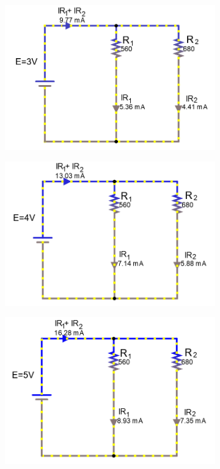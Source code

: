 \documentclass[a4paper]{article}
\begin{document}
\begin{figure}[H]
\begin{subfigure}{0.48\textwidth}
\includegraphics[width=1.16\linewidth]{amps_3}
\end{subfigure}
\begin{subfigure}{0.48\textwidth}
\includegraphics[width=1.16\linewidth]{amps_4}
\end{subfigure}
\begin{subfigure}{0.48\textwidth}
\includegraphics[width=1.16\linewidth]{amps_5}

\end{subfigure}
\end{figure}
\end{document}
